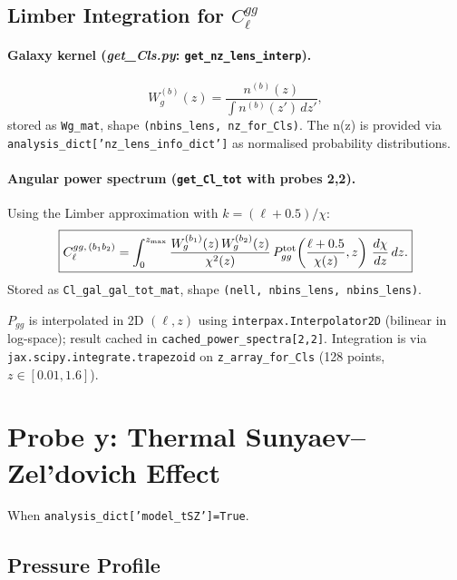 \documentclass[12pt,a4paper]{article}
\newcommand{\code}[1]{\texttt{\small #1}}
\newcommand{\param}[1]{\texttt{\small #1}}
\newcommand{\file}[1]{\textit{\small #1}}
\begin{document}
\subsection{Limber Integration for $C_\ell^{gg}$}
\label{sec:Clgg}

\paragraph{Galaxy kernel (\file{get\_Cls.py}: \code{get\_nz\_lens\_interp}).}
\begin{equation}
  W_g^{(b)}(z) = \frac{n^{(b)}(z)}{\int n^{(b)}(z')\,dz'},
\end{equation}
stored as \code{Wg\_mat}, shape \code{(nbins\_lens, nz\_for\_Cls)}.
The n(z) is provided via \param{analysis\_dict['nz\_lens\_info\_dict']} as
normalised probability distributions.

\paragraph{Angular power spectrum (\code{get\_Cl\_tot} with probes 2,2).}
Using the Limber approximation \citep{Limber1953} with $k = (\ell+0.5)/\chi$:
\begin{equation}
  \boxed{C_\ell^{gg,\,(b_1 b_2)} = \int_0^{z_{\rm max}}
  \frac{W_g^{(b_1)}(z)\,W_g^{(b_2)}(z)}{\chi^2(z)}
  \,P^{\rm tot}_{gg}\!\left(\frac{\ell+0.5}{\chi(z)},z\right)\,\frac{d\chi}{dz}\,dz.}
\end{equation}
Stored as \code{Cl\_gal\_gal\_tot\_mat}, shape \code{(nell, nbins\_lens, nbins\_lens)}.

$P_{gg}$ is interpolated in 2D $(\ell, z)$ using \code{interpax.Interpolator2D}
(bilinear in log-space); result cached in \code{cached\_power\_spectra[2,2]}.
Integration is via \code{jax.scipy.integrate.trapezoid} on
\code{z\_array\_for\_Cls} (128 points, $z\in[0.01,1.6]$).

\section{Probe y: Thermal Sunyaev--Zel'dovich Effect}
\label{sec:probey}

When \param{analysis\_dict['model\_tSZ']=True}.

\subsection{Pressure Profile}
\label{sec:pressure}
\end{document}
